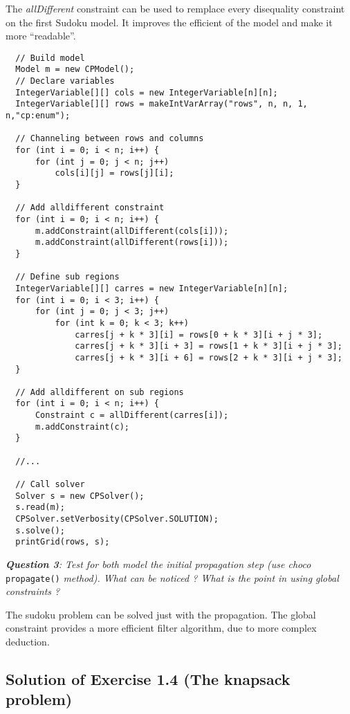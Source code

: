 The \emph{allDifferent} constraint can be used to remplace every disequality constraint on the first Sudoku model. It improves the efficient of the model and make it more ``readable''.

\begin{lstlisting}
  // Build model
  Model m = new CPModel();
  // Declare variables
  IntegerVariable[][] cols = new IntegerVariable[n][n];
  IntegerVariable[][] rows = makeIntVarArray("rows", n, n, 1, n,"cp:enum");
  
  // Channeling between rows and columns
  for (int i = 0; i < n; i++) {
      for (int j = 0; j < n; j++)
          cols[i][j] = rows[j][i];
  }
	
  // Add alldifferent constraint
  for (int i = 0; i < n; i++) {
      m.addConstraint(allDifferent(cols[i]));
      m.addConstraint(allDifferent(rows[i]));
  }

  // Define sub regions
  IntegerVariable[][] carres = new IntegerVariable[n][n];
  for (int i = 0; i < 3; i++) {
      for (int j = 0; j < 3; j++)
          for (int k = 0; k < 3; k++)
              carres[j + k * 3][i] = rows[0 + k * 3][i + j * 3];
              carres[j + k * 3][i + 3] = rows[1 + k * 3][i + j * 3];
              carres[j + k * 3][i + 6] = rows[2 + k * 3][i + j * 3];
  }
	
  // Add alldifferent on sub regions
  for (int i = 0; i < n; i++) {
      Constraint c = allDifferent(carres[i]);
      m.addConstraint(c);
  }
  
  //...
	
  // Call solver
  Solver s = new CPSolver();
  s.read(m);
  CPSolver.setVerbosity(CPSolver.SOLUTION);
  s.solve();
  printGrid(rows, s);
\end{lstlisting} 

\noindent\emph{\textbf{Question 3}: Test for both model the initial propagation step (use choco} \texttt{propagate()} \emph{method). What can be noticed ? What is the point in using global constraints ?}

The sudoku problem can be solved just with the propagation. 
The global constraint provides a more efficient filter algorithm, due to more complex deduction.

\subsection{Solution of Exercise 1.4 (The knapsack problem)}\label{solutions:solutionofexercise1.4}\hypertarget{solutions:solutionofexercise1.4}{}

